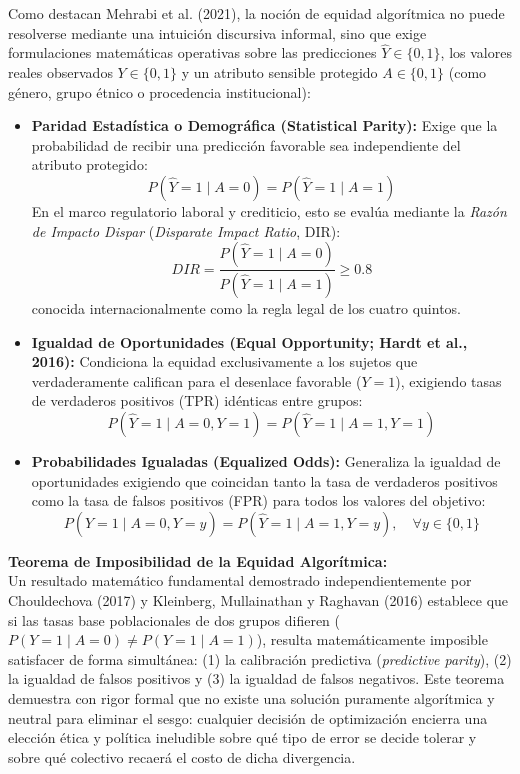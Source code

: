Como destacan Mehrabi et al. (2021), la noción de equidad algorítmica no puede resolverse mediante una intuición discursiva informal, sino que exige formulaciones matemáticas operativas sobre las predicciones $\hat{Y} \in \{0, 1\}$, los valores reales observados $Y \in \{0, 1\}$ y un atributo sensible protegido $A \in \{0, 1\}$ (como género, grupo étnico o procedencia institucional):

\begin{itemize}
    \item \textbf{Paridad Estadística o Demográfica (Statistical Parity):} Exige que la probabilidad de recibir una predicción favorable sea independiente del atributo protegido:
    \begin{equation}
    P(\hat{Y} = 1 \mid A = 0) = P(\hat{Y} = 1 \mid A = 1)
    \end{equation}
    En el marco regulatorio laboral y crediticio, esto se evalúa mediante la \textit{Razón de Impacto Dispar} (\textit{Disparate Impact Ratio}, DIR):
    \begin{equation}
    DIR = \frac{P(\hat{Y} = 1 \mid A = 0)}{P(\hat{Y} = 1 \mid A = 1)} \ge 0.8
    \end{equation}
    conocida internacionalmente como la regla legal de los cuatro quintos.
    \item \textbf{Igualdad de Oportunidades (Equal Opportunity; Hardt et al., 2016):} Condiciona la equidad exclusivamente a los sujetos que verdaderamente califican para el desenlace favorable ($Y = 1$), exigiendo tasas de verdaderos positivos (TPR) idénticas entre grupos:
    \begin{equation}
    P(\hat{Y} = 1 \mid A = 0, Y = 1) = P(\hat{Y} = 1 \mid A = 1, Y = 1)
    \end{equation}
    \item \textbf{Probabilidades Igualadas (Equalized Odds):} Generaliza la igualdad de oportunidades exigiendo que coincidan tanto la tasa de verdaderos positivos como la tasa de falsos positivos (FPR) para todos los valores del objetivo:
    \begin{equation}
    P(\hat{Y} = 1 \mid A = 0, Y = y) = P(\hat{Y} = 1 \mid A = 1, Y = y), \quad \forall y \in \{0, 1\}
    \end{equation}
\end{itemize}

\noindent\textbf{Teorema de Imposibilidad de la Equidad Algorítmica:}\\[0.15cm]
Un resultado matemático fundamental demostrado independientemente por Chouldechova (2017) y Kleinberg, Mullainathan y Raghavan (2016) establece que si las tasas base poblacionales de dos grupos difieren ($P(Y=1 \mid A=0) \neq P(Y=1 \mid A=1)$), resulta matemáticamente imposible satisfacer de forma simultánea: (1) la calibración predictiva (\textit{predictive parity}), (2) la igualdad de falsos positivos y (3) la igualdad de falsos negativos. Este teorema demuestra con rigor formal que no existe una solución puramente algorítmica y neutral para eliminar el sesgo: cualquier decisión de optimización encierra una elección ética y política ineludible sobre qué tipo de error se decide tolerar y sobre qué colectivo recaerá el costo de dicha divergencia.

